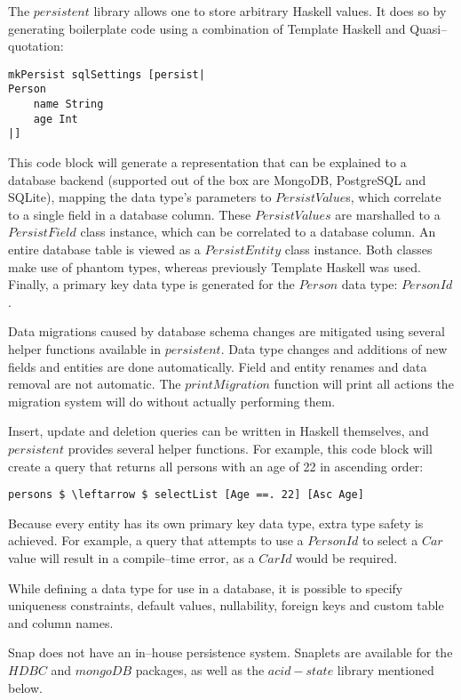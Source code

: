 The $ persistent $ library allows one to store arbitrary Haskell values.
It does so by generating boilerplate code using a combination of Template Haskell and Quasi--quotation:

\begin{lstlisting}
mkPersist sqlSettings [persist|
Person
    name String
    age Int
|]
\end{lstlisting}

This code block will generate a representation that can be explained to a database backend (supported out of the box are MongoDB, PostgreSQL and SQLite), mapping the data type's parameters to $ PersistValue $s, which correlate to a single field in a database column.
These $ PersistValues $ are marshalled to a $ PersistField $ class instance, which can be correlated to a database column.
An entire database table is viewed as a $ PersistEntity $ class instance. Both classes make use of phantom types, whereas previously Template Haskell was used.
Finally, a primary key data type is generated for the $ Person $ data type: $ PersonId $.

Data migrations caused by database schema changes are mitigated using several helper functions available in $ persistent $.
Data type changes and additions of new fields and entities are done automatically. 
Field and entity renames and data removal are not automatic. 
The $ printMigration $ function will print all actions the migration system will do without actually performing them.

Insert, update and deletion queries can be written in Haskell themselves, and $ persistent $ provides several helper functions.
For example, this code block will create a query that returns all persons with an age of 22 in ascending order:

\begin{lstlisting}[mathescape=true]
persons $ \leftarrow $ selectList [Age ==. 22] [Asc Age]
\end{lstlisting}

Because every entity has its own primary key data type, extra type safety is achieved.
For example, a query that attempts to use a $ PersonId $ to select a $ Car $ value will result in a compile--time error, as a $ CarId $ would be required.

While defining a data type for use in a database, it is possible to specify uniqueness constraints, default values, nullability, foreign keys and custom table and column names.

Snap does not have an in--house persistence system. Snaplets are available for the $ HDBC $ and $ mongoDB $ packages, as well as the $ acid-state $ library mentioned below.

